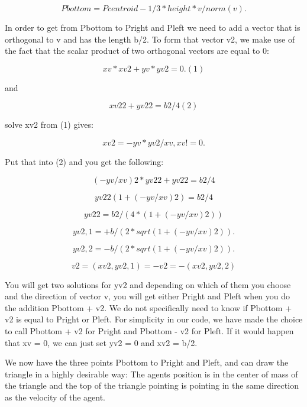 \documentclass[paper=a4, fontsize=11pt,twoside]{scrartcl}		%
\begin{document}
\begin{flushleft}
$$Pbottom = Pcentroid - 1/3 *height*v/norm(v).$$

In order to get from Pbottom to Pright and Pleft we need to add a vector that is orthogonal to v and has the length b/2. To form that vector v2, we make use of the fact that the scalar product of two orthogonal vectors are equal to 0:

$$xv*xv2 + yv*yv2 = 0.     (1)$$

and

$$xv22+yv22 = b2/4     (2)$$

solve xv2 from (1) gives:

$$xv2 = -yv*yv2/xv,        xv != 0.$$

Put that into (2) and you get the following:

$$(-yv/xv)2*yv22 + yv22 = b2/4$$

$$yv22(1+(-yv/xv)2) = b2/4$$

$$yv22 = b2/(4*(1+(-yv/xv)2))$$

$$yv2,1  = + b/(2*sqrt(1+(-yv/xv)2)).$$

$$yv2,2  = - b/(2*sqrt(1+(-yv/xv)2)).$$

$$v2 = (xv2, yv2,1) = -v2 = -(xv2, yv2,2)$$

You will get two solutions for yv2 and depending on which of them you choose and the direction of vector v, you will get either Pright and Pleft when you do the addition Pbottom + v2. We do not specifically need to know if Pbottom + v2 is equal to Pright or Pleft. For simplicity in our code, we have made the choice to call Pbottom + v2 for Pright and Pbottom - v2 for Pleft. If it would happen that xv = 0, we can just set yv2 = 0 and xv2 = b/2. \newline

We now have the three points Pbottom to Pright and Pleft, and can draw the triangle in a highly desirable way: The agents position is in the center of mass of the triangle and the top of the triangle pointing is pointing in the same direction as the velocity of the agent. \newline


\end{flushleft}
\end{document}
